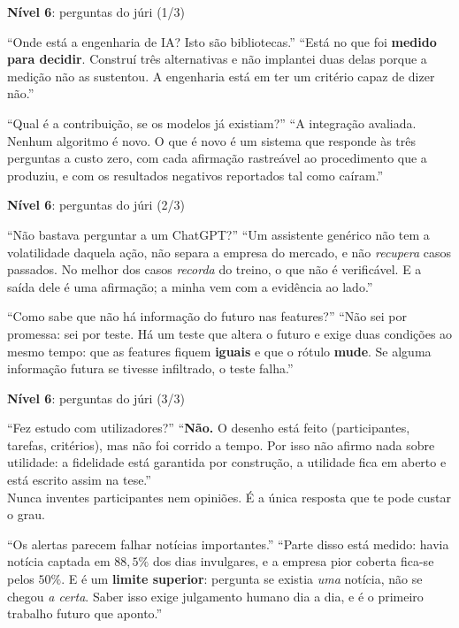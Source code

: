 \documentclass[aspectratio=169]{beamer}
\newcommand{\key}[1]{\textbf{\textcolor{blue!55!black}{#1}}}
\begin{document}
\begin{frame}{\key{Nível 6}: perguntas do júri (1/3)}
\small
\begin{block}{``Onde está a engenharia de IA? Isto são bibliotecas.''}
``Está no que foi \textbf{medido para decidir}. Construí três alternativas e não implantei duas
delas porque a medição não as sustentou. A engenharia está em ter um critério capaz de dizer não.''
\end{block}
\begin{block}{``Qual é a contribuição, se os modelos já existiam?''}
``A integração avaliada. Nenhum algoritmo é novo. O que é novo é um sistema que responde às três
perguntas a custo zero, com cada afirmação rastreável ao procedimento que a produziu, e com os
resultados negativos reportados tal como caíram.''
\end{block}
\end{frame}

\begin{frame}{\key{Nível 6}: perguntas do júri (2/3)}
\small
\begin{block}{``Não bastava perguntar a um ChatGPT?''}
``Um assistente genérico não tem a volatilidade daquela ação, não separa a empresa do mercado, e não
\emph{recupera} casos passados. No melhor dos casos \emph{recorda} do treino, o que não é
verificável. E a saída dele é uma afirmação; a minha vem com a evidência ao lado.''
\end{block}
\begin{block}{``Como sabe que não há informação do futuro nas features?''}
``Não sei por promessa: sei por teste. Há um teste que altera o futuro e exige duas condições ao
mesmo tempo: que as features fiquem \textbf{iguais} e que o rótulo \textbf{mude}. Se alguma
informação futura se tivesse infiltrado, o teste falha.''
\end{block}
\end{frame}

\begin{frame}{\key{Nível 6}: perguntas do júri (3/3)}
\small
\begin{block}{``Fez estudo com utilizadores?''}
``\textbf{Não.} O desenho está feito (participantes, tarefas, critérios), mas não foi corrido a
tempo. Por isso não afirmo nada sobre utilidade: a fidelidade está garantida por construção, a
utilidade fica em aberto e está escrito assim na tese.''\\
\footnotesize \textcolor{red!60!black}{Nunca inventes participantes nem opiniões. É a única resposta
que te pode custar o grau.}
\end{block}
\begin{block}{``Os alertas parecem falhar notícias importantes.''}
``Parte disso está medido: havia notícia captada em $88{,}5\%$ dos dias invulgares, e a empresa pior
coberta fica-se pelos $50\%$. E é um \textbf{limite superior}: pergunta se existia \emph{uma}
notícia, não se chegou \emph{a certa}. Saber isso exige julgamento humano dia a dia, e é o primeiro
trabalho futuro que aponto.''
\end{block}
\end{frame}
\end{document}
